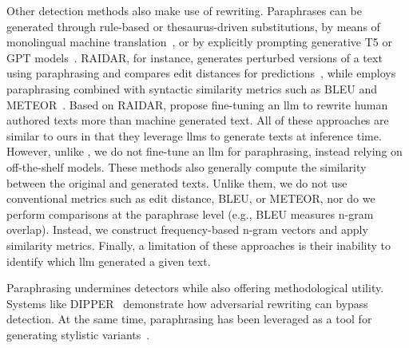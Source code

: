 Other detection methods also make use of rewriting. 
Paraphrases can be generated through rule-based or thesaurus-driven substitutions, by means of monolingual machine translation~\citep{zhou_paraphrase_2021}, or by explicitly prompting generative T5 or GPT models~\citep{kurt_pehlivanoglu_comparative_2024}.
RAIDAR, for instance, generates perturbed versions of a text using paraphrasing and compares edit distances for predictions~\citep{mao_raidar_2024}, while \mirrorMinds{} employs paraphrasing combined with syntactic similarity metrics such as BLEU and METEOR~\citep{baradia_mirror_2025}. 
Based on RAIDAR, \citet{li_learning_2025} propose fine-tuning an \ac{llm} to rewrite human authored texts more than machine generated text.
All of these approaches are similar to ours in that they leverage \acp{llm} to generate texts at inference time. 
However, unlike \citet{li_learning_2025}, we do not fine-tune an \ac{llm} for paraphrasing, instead relying on off-the-shelf models.
These methods also generally compute the similarity between the original and generated texts. 
Unlike them, we do not use conventional metrics such as edit distance, BLEU, or METEOR, nor do we perform comparisons at the paraphrase level (e.g., BLEU measures n-gram overlap). 
Instead, we construct frequency-based n-gram vectors and apply similarity metrics.
Finally, a limitation of these approaches is their inability to identify which \ac{llm} generated a given text.

Paraphrasing undermines detectors while also offering methodological utility. 
Systems like DIPPER~\citep{Krishna_dipper_2023} demonstrate how adversarial rewriting can bypass detection. 
At the same time, paraphrasing has been leveraged as a tool for generating stylistic variants~\citep{mao_raidar_2024,baradia_mirror_2025}.
